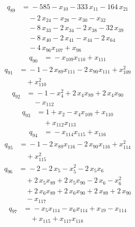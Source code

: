 \begin{align*}
q_{89} &={}-585 -x_{10} -333\,x_{11} -164\,x_{21}\\
&\quad -2\,x_{24} -x_{28} -x_{30} -x_{32}\\
&\quad -8\,x_{33} -2\,x_{34} -2\,x_{38} -32\,x_{39}\\
&\quad -8\,x_{40} -2\,x_{41} -x_{44} -2\,x_{64}\\
&\quad -4\,x_{96}x_{107} +x_{98}
\end{align*}
\begin{align*}
q_{90} &={}-x_{109}x_{110} +x_{111}
\end{align*}
\begin{align*}
q_{91} &={}-1 -2\,x_{89}x_{111} -2\,x_{90}x_{111} +x_{109}^{2}\\
&\quad +x_{110}^{2}
\end{align*}
\begin{align*}
q_{92} &={}-1 -x_{4}^{2} +2\,x_{4}x_{89} +2\,x_{4}x_{90}\\
&\quad -x_{112}
\end{align*}
\begin{align*}
q_{93} &={}1 +x_{2} -x_{4}x_{109} +x_{110}\\
&\quad +x_{112}x_{113}
\end{align*}
\begin{align*}
q_{94} &={}-x_{114}x_{115} +x_{116}
\end{align*}
\begin{align*}
q_{95} &={}-1 -2\,x_{89}x_{116} -2\,x_{90}x_{116} +x_{114}^{2}\\
&\quad +x_{115}^{2}
\end{align*}
\begin{align*}
q_{96} &={}-2 -2\,x_{5} -x_{5}^{2} -2\,x_{5}x_{6}\\
&\quad +2\,x_{5}x_{89} +2\,x_{5}x_{90} -2\,x_{6} -x_{6}^{2}\\
&\quad +2\,x_{6}x_{89} +2\,x_{6}x_{90} +2\,x_{89} +2\,x_{90}\\
&\quad -x_{117}
\end{align*}
\begin{align*}
q_{97} &={}-x_{5}x_{114} -x_{6}x_{114} +x_{19} -x_{114}\\
&\quad +x_{115} +x_{117}x_{118}
\end{align*}
